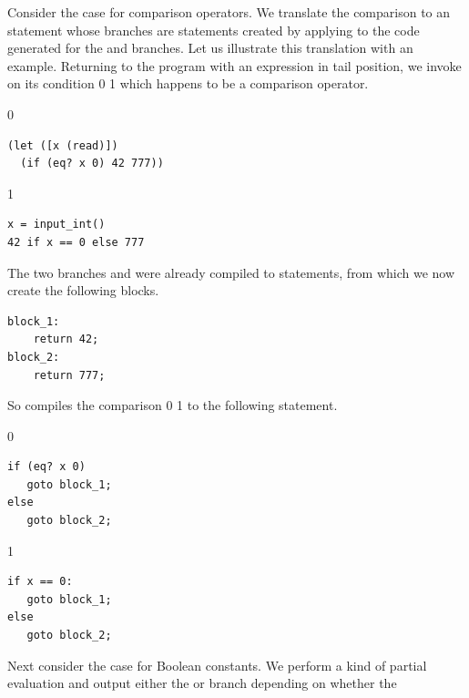 \documentclass[7x10,nocrop]{TimesAPriori_MIT}%
\def\racketEd{0}
\def\pythonEd{1}
\def\edition{0}
\newcommand{\racket}[1]{{\if\edition\racketEd{#1}\fi}}
\newcommand{\python}[1]{{\if\edition\pythonEd #1\fi}}
\begin{document}
Consider the case for comparison operators. We translate the
comparison to an  statement whose branches are 
statements created by applying  to the code
generated for the  and  branches. Let us
illustrate this translation with an example.  Returning
to the program with an  expression in tail position,
we invoke  on its condition
\racket{}
\python{}
which happens to be a comparison operator.
{\if\edition\racketEd
\begin{lstlisting}
(let ([x (read)])
  (if (eq? x 0) 42 777))
\end{lstlisting}
  \fi}
{\if\edition\pythonEd
\begin{lstlisting}
x = input_int()
42 if x == 0 else 777
\end{lstlisting}
  \fi}
The two branches  and  were already compiled to 
statements, from which we now create the following blocks.
\begin{center}
\begin{minipage}{\textwidth}
\begin{lstlisting}
block_1:
    return 42;
block_2:
    return 777;
\end{lstlisting}
  \end{minipage}
\end{center}
%
So  compiles the comparison
\racket{}
\python{}
to the following  statement.
%
{\if\edition\racketEd
\begin{center}
\begin{minipage}{\textwidth}
\begin{lstlisting}
if (eq? x 0)
   goto block_1;
else
   goto block_2;
\end{lstlisting}
\end{minipage}
\end{center}
\fi}
{\if\edition\pythonEd
\begin{center}
\begin{minipage}{\textwidth}
\begin{lstlisting}
if x == 0:
   goto block_1;
else
   goto block_2;
\end{lstlisting}
\end{minipage}
\end{center}
\fi}
Next consider the case for Boolean constants. We perform a kind of
partial evaluation and output
either the  or  branch depending on whether the
\end{document}
